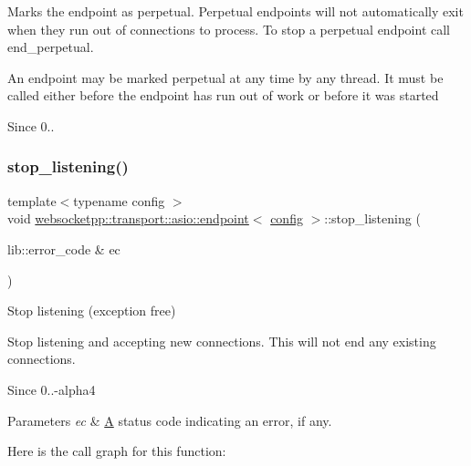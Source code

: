 Marks the endpoint as perpetual. Perpetual endpoints will not automatically exit when they run out of connections to process. To stop a perpetual endpoint call {\ttfamily end\+\_\+perpetual}.

An endpoint may be marked perpetual at any time by any thread. It must be called either before the endpoint has run out of work or before it was started

\begin{DoxySince}{Since}
0.. 
\end{DoxySince}
\mbox{\label{classwebsocketpp_1_1transport_1_1asio_1_1endpoint_a0da87d3a3e8ee8279fe59eb0385d81e3}} 
\subsubsection{\texorpdfstring{stop\+\_\+listening()}{stop\_listening()}\hspace{0.1cm}{\footnotesize\ttfamily [1/2]}}
{\footnotesize\ttfamily template$<$typename config $>$ \\
void \mbox{\hyperlink{classwebsocketpp_1_1transport_1_1asio_1_1endpoint}{websocketpp\+::transport\+::asio\+::endpoint}}$<$ \mbox{\hyperlink{classconfig}{config}} $>$\+::stop\+\_\+listening (\begin{DoxyParamCaption}\item[{lib\+::error\+\_\+code \&}]{ec }\end{DoxyParamCaption})\hspace{0.3cm}{\ttfamily [inline]}}



Stop listening (exception free) 

Stop listening and accepting new connections. This will not end any existing connections.

\begin{DoxySince}{Since}
0..-\/alpha4 
\end{DoxySince}

\begin{DoxyParams}{Parameters}
{\em ec} & \mbox{\hyperlink{struct_a}{A}} status code indicating an error, if any. \\
\hline
\end{DoxyParams}
Here is the call graph for this function\+:
\mbox{\label{classwebsocketpp_1_1transport_1_1asio_1_1endpoint_af4ae00e12a34475a1950d69f5b9da507}} 
